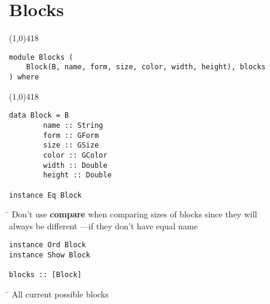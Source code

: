 \section{Blocks}
\begin{center}
\line(1,0){418}
\end{center}
\begin{verbatim}
module Blocks (
    Block(B, name, form, size, color, width, height), blocks
) where
\end{verbatim}
\begin{center}
\line(1,0){418}
\end{center}
\begin{verbatim}
data Block = B
        name :: String
        form :: GForm
        size :: GSize
        color :: GColor
        width :: Double
        height :: Double

instance Eq Block
\end{verbatim}
\begin{tabbing}
\hspace*{1cm}\= \kill
\> Don’t use \textbf{compare} when comparing sizes of blocks since they will \\
\> always be different —if they don’t have equal name
\end{tabbing}
\begin{verbatim}
instance Ord Block
instance Show Block

blocks :: [Block]
\end{verbatim}
\begin{tabbing}
\hspace*{1cm}\= \kill
\> All current possible blocks
\end{tabbing}

